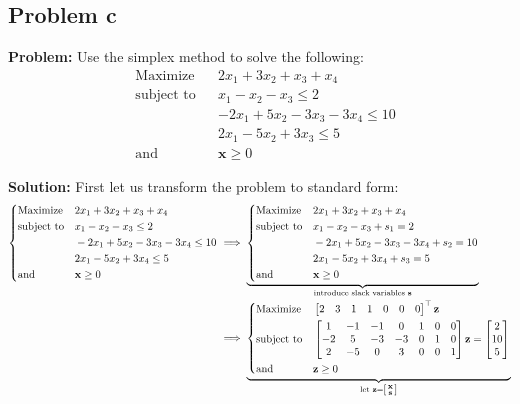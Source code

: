 \documentclass{article}
\newcommand{\icol}[1]{%
  \begin{bsmallmatrix}#1\end{bsmallmatrix}%
}
\renewcommand\vec{\mathbf}
\begin{document}
\subsection*{Problem c}
\noindent\textbf{Problem:} Use the simplex method to solve the following:
$$\begin{aligned}
    &{\text{Maximize}}
    &&2x_1+3x_2+x_3+x_4\\
    &{\text{subject to}}
    &&x_1-x_2-x_3\le2\\
    &
    &&-2x_1+5x_2-3x_3-3x_4\le10\\
    &
    &&2x_1-5x_2+3x_3\le5\\
    &{\text{and}}
    &&\vec x\ge 0
\end{aligned}$$
\bigskip

\noindent\textbf{Solution:} First let us transform the problem to standard form:
\begin{align*}
    \left\{\begin{aligned}
        &{\text{Maximize}}
        &&2x_1+3x_2+x_3+x_4\\
        &{\text{subject to}}
        &&x_1-x_2-x_3\le2\\
        &
        &&-2x_1+5x_2-3x_3-3x_4\le10\\
        &
        &&2x_1-5x_2+3x_4\le5\\
        &{\text{and}}
        &&\vec x\ge 0
    \end{aligned}\right.
    &\implies
    \underbrace{\left\{\begin{aligned}
        &{\text{Maximize}}
        &&2x_1+3x_2+x_3+x_4\\
        &{\text{subject to}}
        &&x_1-x_2-x_3+s_1=2\\
        &
        &&-2x_1+5x_2-3x_3-3x_4+s_2=10\\
        &
        &&2x_1-5x_2+3x_4+s_3=5\\
        &{\text{and}}
        &&\vec x\ge 0
    \end{aligned}\right.}_{\text{introduce slack variables } \vec s}\\
    &\implies
    \underbrace{\left\{\begin{aligned}
        &{\text{Maximize}}
        &&\begin{bmatrix}
            2&3&1&1&0&0&0
        \end{bmatrix}^\top\vec z\\
        &{\text{subject to}}
        &&\begin{bmatrix}
            1&-1&-1&0&1&0&0\\
            -2&5&-3&-3&0&1&0\\
            2&-5&0&3&0&0&1
        \end{bmatrix}\vec z=\begin{bmatrix}
            2\\10\\5
        \end{bmatrix}\\
        &{\text{and}}
        &&\vec z\ge 0
    \end{aligned}\right.}_{\text{let }\vec z=\icol{\vec x\\\vec s}}
\end{align*}
\end{document}
